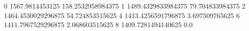0 1567.9814453125 158.2532958984375
1 1489.4329833984375 79.704833984375
2 1464.4530029296875 54.724853515625
4 1413.4256591796875 3.697509765625
6 1411.7967529296875 2.068603515625
8 1409.7281494140625 0.0
